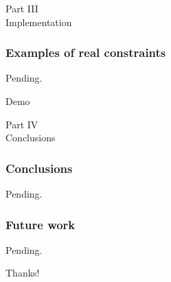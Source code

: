 \documentclass{beamer}
\newcommand{\partslide}[2]{
  \begin{center}
    \LARGE{#1} \\
    \vspace{0.5cm}
    \huge{#2}
  \end{center}
}
\begin{document}

\begin{frame}
  \partslide{Part III}{Implementation}
\end{frame}

\begin{frame}
  \frametitle{Examples of real constraints}

  Pending.
\end{frame}

\begin{frame}
  \begin{center}
    \Huge{Demo}
  \end{center}
\end{frame}


\begin{frame}
  \partslide{Part IV}{Conclusions}
\end{frame}

\begin{frame}
  \frametitle{Conclusions}

  Pending.
\end{frame}

\begin{frame}
  \frametitle{Future work}

  Pending.
\end{frame}

\begin{frame}
  \begin{center}
    \Huge{Thanks!}
  \end{center}
\end{frame}
\end{document}
